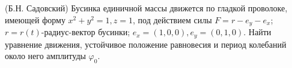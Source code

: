 (Б.Н. Садовский)
Бусинка единичной массы движется по гладкой проволоке, имеющей
форму $x^2+y^2=1,z=1$, под действием силы $F=r-e_y-e_x$;
$r=r(t)$-радиус-вектор бусинки; $e_x=(1,0,0),e_y=(0,1,0)$. Найти уравнение
движения, устойчивое положение равновесия и период колебаний около
него амплитуды $\varphi_0$.
